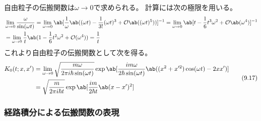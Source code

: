 自由粒子の伝搬関数は$\omega\to0$で求められる。
計算には次の極限を用いる。
\begin{equation}
  \begin{split}
    &\lim_{\omega\to0}\frac{\omega}{\sin(\omega t)}
    =\lim_{\omega\to0}\ab[
      \frac{1}{\omega}
      \ab((\omega t)-\frac{1}{3!}(\omega t)^3+\mathcal{O}\ab((\omega t)^5))
    ]^{-1}
    =\lim_{\omega\to0}\ab[
      t-\frac{1}{6}t^3\omega^2+\mathcal{O}\ab(\omega^4)
    ]^{-1} \\
    &=\lim_{\omega\to0}\frac{1}{t}\ab(
    1-\frac{1}{6}t^2\omega^2+\mathcal{O}(\omega^4)
    )=\frac{1}{t}
  \end{split}
\end{equation}
これより自由粒子の伝搬関数として次を得る。
\begin{equation}
  \begin{split}
    K_0(t;x,x')
    &=\lim_{\omega\to0}
    \sqrt{\frac{m\omega}{2\pi i\hbar\sin(\omega t)}}
    \exp\ab[
      \frac{im\omega}{2\hbar\sin(\omega t)}
      \ab(
      (x^2+x'^2)\cos(\omega t) -2xx'
      )
    ] \\
    &=\sqrt{\frac{m}{2\pi i\hbar t}}
    \exp\ab[
      \frac{im}{2\hbar t}
      \ab(x-x')^2
    ]
  \end{split}
  \tag{9.17}
\end{equation}

\subsubsection{経路積分による伝搬関数の表現}

